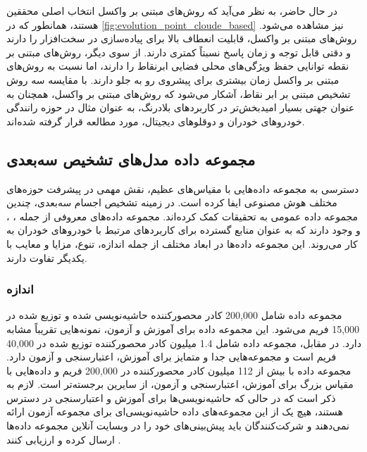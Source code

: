 در حال حاضر، به نظر می‌آید که روش‌های مبتنی بر واکسل انتخاب اصلی محققین هستند، همانطور که در \cref{fig:evolution_point_cloude_based} نیز مشاهده می‌شود. روش‌های مبتنی بر واکسل، قابلیت انعطاف بالا برای پیاده‌سازی در سخت‌افزار را دارند و دقتی قابل توجه و زمان پاسخ نسبتاً کمتری دارند. از سوی دیگر، روش‌های مبتنی بر نقطه توانایی حفظ ویژگی‌های محلی فضایی ابرنقاط را دارند، اما نسبت به روش‌های مبتنی بر واکسل زمان بیشتری برای پیشروی رو به جلو دارند. با مقایسه سه روش تشخیص مبتنی بر ابر نقاط، آشکار می‌شود که روش‌های مبتنی بر واکسل، همچنان به عنوان جهتی بسیار امیدبخش‌تر در کاربردهای بلادرنگ، به عنوان مثال در حوزه رانندگی خودروهای خودران و دوقلوهای دیجیتال، مورد مطالعه قرار گرفته شده‌اند.

\subsection{مجموعه داده مدل‌های تشخیص سه‌بعدی}

دسترسی به مجموعه‌ داده‌هایی با مقیاس‌های عظیم، نقش مهمی در پیشرفت حوزه‌های مختلف هوش‌ مصنوعی ایفا کرده است. در زمینه تشخیص اجسام سه‌بعدی، چندین مجموعه داده عمومی به تحقیقات کمک کرده‌اند. مجموعه‌ داده‌های معروفی از جمله  \cite{geiger2012we}،  \cite{caesar2020nuscenes}، و  \cite{sun2020scalability}   وجود دارند که به عنوان  منابع گسترده برای کاربردهای مرتبط با خودرو‌های خودران به کار می‌روند. این مجموعه‌ داده‌ها در ابعاد مختلف از جمله اندازه، تنوع، مزایا و معایب با یکدیگر تفاوت دارند.

\subsubsection{اندازه}

مجموعه داده  شامل 200,000 کادر محصورکننده حاشیه‌نویسی شده و توزیع شده در 15,000 فریم می‌شود. این مجموعه داده برای آموزش و آزمون، نمونه‌هایی تقریباً مشابه دارد. در مقابل، مجموعه داده  شامل 1.4 میلیون کادر محصورکننده توزیع شده در 40,000 فریم است و مجموعه‌هایی جدا و متمایز برای آموزش، اعتبارسنجی و آزمون دارد. مجموعه داده  با بیش از 112 میلیون کادر محصورکننده در 200,000 فریم و داده‌هایی با مقیاس بزرگ برای آموزش، اعتبارسنجی و آزمون، از سایرین برجسته‌تر است. لازم به ذکر است که در حالی که حاشیه‌نویسی‌ها برای آموزش و اعتبارسنجی در دسترس هستند، هیچ یک از این مجموعه‌های داده حاشیه‌نویسی‌ای برای مجموعه‌ آزمون ارائه نمی‌دهند و شرکت‌کنندگان باید پیش‌بینی‌های خود را در وبسایت آنلاین مجموعه‌ داده‌ها  ارسال کرده و ارزیابی کنند \cite{qian20223d}.

